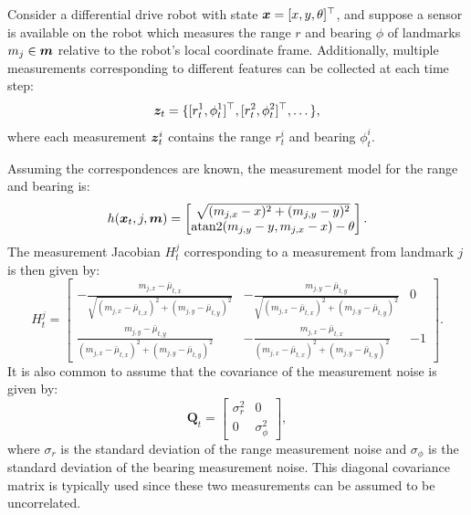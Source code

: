 \begin{example} \label{ex:rangeandbearing}
\theoremstyle{definition}
Consider a differential drive robot with state $\bm{x} = [x, y, \theta]^\top $, and suppose a sensor is available on the robot which measures the range $r$ and bearing $\phi$ of landmarks $m_j \in \bm{m}$ relative to the robot’s local coordinate frame. Additionally, multiple measurements corresponding to different features can be collected at each time step:
\begin{equation*}
\bm{z}_t = \{[r_t^1,\phi_t^1]^\top , [r_t^2,\phi_t^2]^\top , \dots\},
\end{equation*}
where each measurement $\bm{z}_t^i$ contains the range $r_t^i$ and bearing $\phi_t^i$. 

Assuming the correspondences are known, the measurement model for the range and bearing is:
\begin{equation}
h(\bm{x}_t, j, \bm{m})  = \begin{bmatrix}
\sqrt{(m_{j,x} - x)^{2} + (m_{j,y}- y)^{2}} \\
\text{atan2}(m_{j,y}- y, m_{j,x} - x) - \theta
\end{bmatrix}.
\end{equation}
The measurement Jacobian $H^j_t$ corresponding to a measurement from landmark $j$ is then given by:
\begin{equation}
H^j_t = \begin{bmatrix}
-\frac{m_{j,x} - \bar{\mu}_{t,x}}{\sqrt{(m_{j,x} - \bar{\mu}_{t,x})^2 + (m_{j,y} - \bar{\mu}_{t,y})^2}} & -\frac{m_{j,y} - \bar{\mu}_{t,y}}{\sqrt{(m_{j,x} - \bar{\mu}_{t,x})^2 + (m_{j,y} - \bar{\mu}_{t,y})^2}} & 0 \\
\frac{m_{j,y} - \bar{\mu}_{t,y}}{(m_{j,x} - \bar{\mu}_{t,x})^2 + (m_{j,y} - \bar{\mu}_{t,y})^2} & -\frac{m_{j,x} - \bar{\mu}_{t,x}}{(m_{j,x} - \bar{\mu}_{t,x})^2 + (m_{j,y} - \bar{\mu}_{t,y})^2} & -1
\end{bmatrix}.
\end{equation}
It is also common to assume that the covariance of the measurement noise is given by:
\begin{equation*}
\bm{Q}_t = \begin{bmatrix}
\sigma_r^2 & 0 \\ 0 & \sigma_\phi^2
\end{bmatrix},
\end{equation*}
where $\sigma_r$ is the standard deviation of the range measurement noise and $\sigma_\phi$ is the standard deviation of the bearing measurement noise. This diagonal covariance matrix is typically used since these two measurements can be assumed to be uncorrelated.
\end{example}


